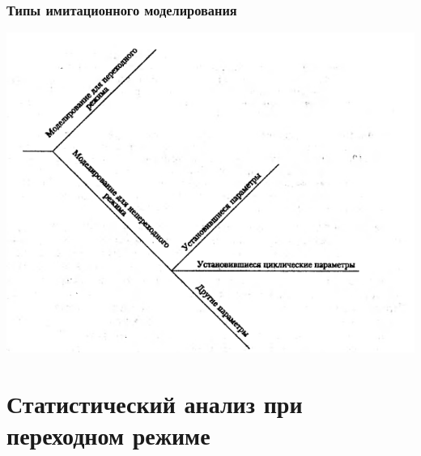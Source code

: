 \documentclass[utf8]{beamer}
\begin{document}
\begin{frame}
\frametitle{Типы имитационного моделирования}
\begin{center}
\includegraphics[width=.8\textwidth]{pic/9-4.png}
\end{center}
\end{frame}
\section{Статистический анализ при переходном режиме}
\end{document}
